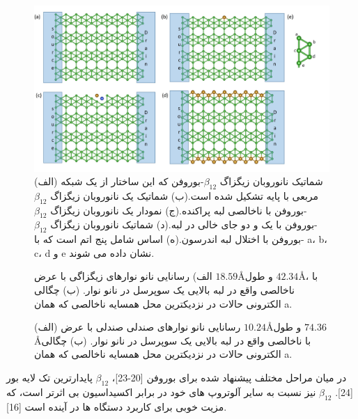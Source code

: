 \begin{figure}[!ht]
  \centering
    \includegraphics[width=1\linewidth]{./figures/borophene_structure(3).JPG}
    \caption{(الف) شماتیک نانوروبان زیگزاگ $\beta_{12}$-بوروفن که این ساختار از یک شبکه مربعی با پایه تشکیل شده است.(ب) شماتیک یک نانوروبان زیگزاگ $\beta_{12}$-بوروفن با ناخالصی لبه پراکنده.(ج) نمودار یک نانوروبان زیگزاگ $\beta_{12}$-بوروفن با یک و دو جای خالی در لبه.(د) شماتیک نانوروبان زیگزاگ $\beta_{12}$-بوروفن با اختلال لبه اندرسون.(ه) اساس شامل پنج اتم است که با a، b، c، d و e نشان داده می شوند.}
   \label{borophene}
\end{figure}
  \begin{figure}[!ht]
    \centering
    
    \caption{الف) رسانایی نانو نوارهای زیگزاگی با عرض $18.59$\AA و طول $42.34$\AA، با ناخالصی واقع در لبه بالایی یک سوپرسل در نانو نوار. (ب) چگالی الکترونی حالات در نزدیکترین محل همسایه ناخالصی که همان a.}
    \label{zigscatter}
  \end{figure}
  \begin{figure}[ht]
    \centering
    
    \caption{(الف) رسانایی نانو نوارهای صندلی صندلی با عرض $10.24$\AA و طول $74.36$\AA با ناخالصی واقع در لبه بالایی یک سوپرسل در نانو نوار. (ب) چگالی الکترونی حالات در نزدیکترین محل همسایه ناخالصی که همان a.}
    \label{armscatter}
  \end{figure}

در میان مراحل مختلف پیشنهاد شده برای بوروفن [20-23]، $\beta_{12}$  پایدارترین تک لایه بور [24]. $\beta_{12}$ نیز نسبت به سایر آلوتروپ های خود در برابر اکسیداسیون بی اثرتر است، که مزیت خوبی برای کاربرد دستگاه ها در آینده است [16].

